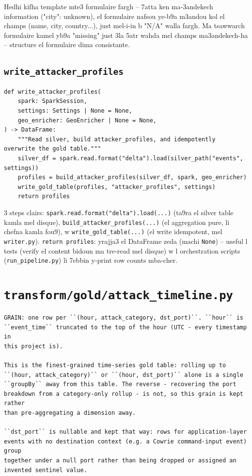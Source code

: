 \documentclass[11pt,a4paper]{report}
\DeclareRobustCommand{\code}[1]{\texttt{#1}}
\DeclareRobustCommand{\file}[1]{\texttt{\color{amber}#1}}
\begin{document}
\begin{analogy}
Hedhi kifha template mte3 formulaire fargh -- 7atta ken ma-3andekech
information ("city": unknown), el formulaire nafsou ye-b9a m3andou kol
el champs (name, city, country...), just mel-i-in b "N/A" walla fargh.
Ma tsawwarch formulaire kamel yb9a "missing" just 3la 5atr wahda mel
champs ma3andekech-ha -- structure el formulaire dima consistante.
\end{analogy}

\subsection{\code{write\_attacker\_profiles}}

\begin{lstlisting}[style=pystyle]
def write_attacker_profiles(
    spark: SparkSession,
    settings: Settings | None = None,
    geo_enricher: GeoEnricher | None = None,
) -> DataFrame:
    """Read silver, build attacker_profiles, and idempotently overwrite the gold table."""
    silver_df = spark.read.format("delta").load(silver_path("events", settings))
    profiles = build_attacker_profiles(silver_df, spark, geo_enricher)
    write_gold_table(profiles, "attacker_profiles", settings)
    return profiles
\end{lstlisting}

3 steps clairs: \code{spark.read.format("delta").load(...)} (ta9ra el
silver table kamla mel disque), \code{build\_attacker\_profiles(...)}
(el aggregation pure, li chefna kamla fou9), w \code{write\_gold\_table(...)}
(el write idempotent, mel \code{writer.py}). \code{return profiles}:
yrajja3 el DataFrame zeda (machi \code{None}) -- useful l tests (verify
el content bidoun ma tre-read mel disque) w l orchestration scripts
(\code{run\_pipeline.py}) li 7ebbin y-print row counts mba-cher.

\section{\file{transform/gold/attack\_timeline.py}}

\begin{lstlisting}[style=pystyle]
GRAIN: one row per ``(hour, attack_category, dst_port)``. ``hour`` is
``event_time`` truncated to the top of the hour (UTC - every timestamp in
this project is).

This is the finest-grained time-series gold table: rolling up to
``(hour, attack_category)`` or ``(hour, dst_port)`` alone is a single
``groupBy`` away from this table. The reverse - recovering the port
breakdown from a category-only rollup - is not, so this grain is kept rather
than pre-aggregating a dimension away.

``dst_port`` is nullable and kept that way: rows for application-layer
events with no destination context (e.g. a Cowrie command-input event) group
together under a null port rather than being dropped or assigned an
invented sentinel value.
\end{lstlisting}
\end{document}

